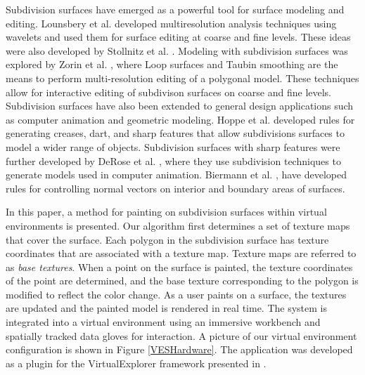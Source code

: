 \documentclass[10pt,twocolumn]{article}
\begin{document}


Subdivision surfaces have emerged as a powerful tool for surface modeling and editing.  
Lounsbery et al. \cite{Lounsbery:1997:MAS} developed 
multiresolution analysis techniques using wavelets and used them for
surface editing at coarse and fine levels.
These ideas were also developed by Stollnitz et al. \cite{Stollnitz96-WCGTA}.
Modeling with subdivision surfaces was explored by Zorin et al. 
\cite{Zorin:1997:IMM}, where Loop surfaces \cite{Loop:1994:GTS} and 
Taubin smoothing \cite{Taubin:1995:SPA} are the means to 
perform multi-resolution editing of a polygonal model. 
These techniques allow for interactive
editing of subdivison surfaces on coarse and fine levels.
Subdivision surfaces have also been extended to general design applications
such as computer animation and geometric modeling.
Hoppe et al. \cite{Hoppe:1994:PSS}
developed rules for generating creases, dart, and sharp features
that allow subdivisions surfaces to model a wider range of objects. 
Subdivision surfaces with sharp features were further developed by DeRose et al. 
\cite{DeRose:1998:SSC}, where they use subdivision techniques
to generate models used in computer animation.
Biermann et al. \cite{EVL-2000-47}, have developed rules for controlling 
normal vectors on interior and boundary areas of surfaces.


In this paper, a method for painting on subdivision 
surfaces within virtual environments is presented.
Our algorithm first determines a set of texture maps that cover the surface.
Each polygon in the subdivision surface has texture coordinates
that are associated with a texture map. 
Texture maps are referred to as {\em base textures}.
When a point on the surface is painted, the texture coordinates of the
point are determined, and the base texture corresponding to the polygon is modified
to reflect the color change. 
As a user paints on a surface, the textures are updated
and the painted model is rendered in real time.
The system is integrated into a virtual environment using an immersive workbench
and spatially tracked data gloves for interaction.
A picture of our virtual environment configuration
is shown in Figure \ref{VESHardware}.
The application was developed as a plugin for
the VirtualExplorer framework presented in \cite{Kuester:2001:VirtualExplorer}.
\end{document}
